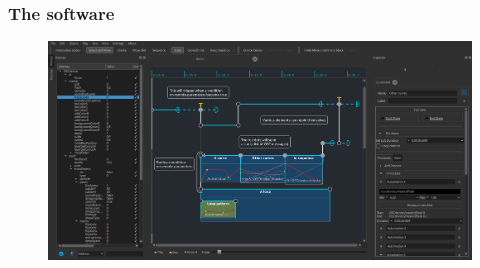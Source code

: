 \documentclass{beamer}
\begin{document}
\begin{frame}
    \frametitle{The software}    
    \begin{figure}
    	\centering
    	\includegraphics[width=\textwidth]{images/iscore.png}
    \end{figure}    
\end{frame}
\end{document}
